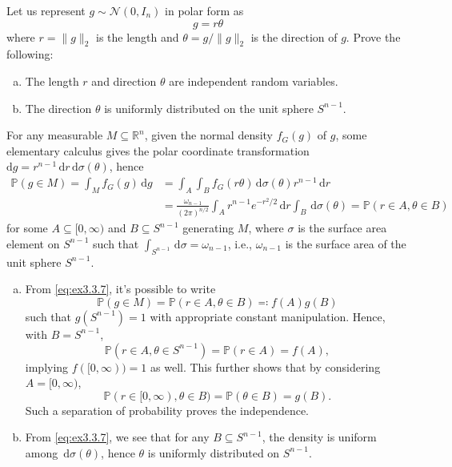 \begin{problem*}[Exercise 3.3.7]\label{ex3.3.7}
	Let us represent \(g \sim \mathcal{N} (0, I_n)\) in polar form as
	\[
		g = r \theta
	\]
	where \(r = \lVert g \rVert _2\) is the length and \(\theta = g / \lVert g \rVert _2\) is the direction of \(g\). Prove the following:
	\begin{enumerate}[(a)]
		\item\label{ex3.3.7:a} The length \(r\) and direction \(\theta \) are independent random variables.
		\item\label{ex3.3.7:b} The direction \(\theta \) is uniformly distributed on the unit sphere \(S^{n-1}\).
	\end{enumerate}
\end{problem*}
\begin{answer}
	For any measurable \(M \subseteq \mathbb{R} ^n\), given the normal density \(f_G(g)\) of \(g\), some elementary calculus gives the polar coordinate transformation \(\mathrm{d} g = r^{n-1} \,\mathrm{d} r \,\mathrm{d} \sigma (\theta )\), hence
	\begin{equation}\label{eq:ex3.3.7}
		\begin{split}
			\mathbb{P} (g \in M)
			= \int _M f_G(g) \,\mathrm{d} g
			 & = \int _A \int _B f_G(r \theta ) \,\mathrm{d} \sigma (\theta ) r^{n-1} \,\mathrm{d} r                                     \\
			 & = \frac{\omega _{n-1}}{(2\pi )^{n / 2}} \int _A r^{n-1} e^{- r^2 / 2} \,\mathrm{d} r \int _B \,\mathrm{d}\sigma (\theta )
			= \mathbb{P} (r \in A, \theta \in B)
		\end{split}
	\end{equation}
	for some \(A \subseteq [0, \infty )\) and \(B \subseteq S^{n-1}\) generating \(M\), where \(\sigma \) is the surface area element on \(S^{n-1}\) such that \(\int _{S^{n-1}} \,\mathrm{d} \sigma = \omega _{n-1}\), i.e., \(\omega _{n-1}\) is the surface area of the unit sphere \(S^{n-1} \).
	\begin{enumerate}[(a)]
		\item From \autoref{eq:ex3.3.7}, it's possible to write
		      \[
			      \mathbb{P} (g\in M)
			      = \mathbb{P} (r \in A, \theta \in B)
			      \eqqcolon f(A) g(B)
		      \]
		      such that \(g(S^{n-1}) = 1\) with appropriate constant manipulation. Hence, with \(B = S^{n-1}\),
		      \[
			      \mathbb{P} (r \in A, \theta \in S^{n-1})
			      = \mathbb{P} (r \in A)
			      = f(A),
		      \]
		      implying \(f([0, \infty ))= 1\) as well. This further shows that by considering \(A = [0, \infty )\),
		      \[
			      \mathbb{P} (r \in [0, \infty ), \theta \in B)
			      = \mathbb{P} (\theta \in B)
			      = g(B).
		      \]
		      Such a separation of probability proves the independence.
		\item From \autoref{eq:ex3.3.7}, we see that for any \(B \subseteq S^{n-1}\), the density is uniform among \(\,\mathrm{d} \sigma (\theta )\), hence \(\theta \) is uniformly distributed on \(S^{n-1}\).
	\end{enumerate}
\end{answer}

